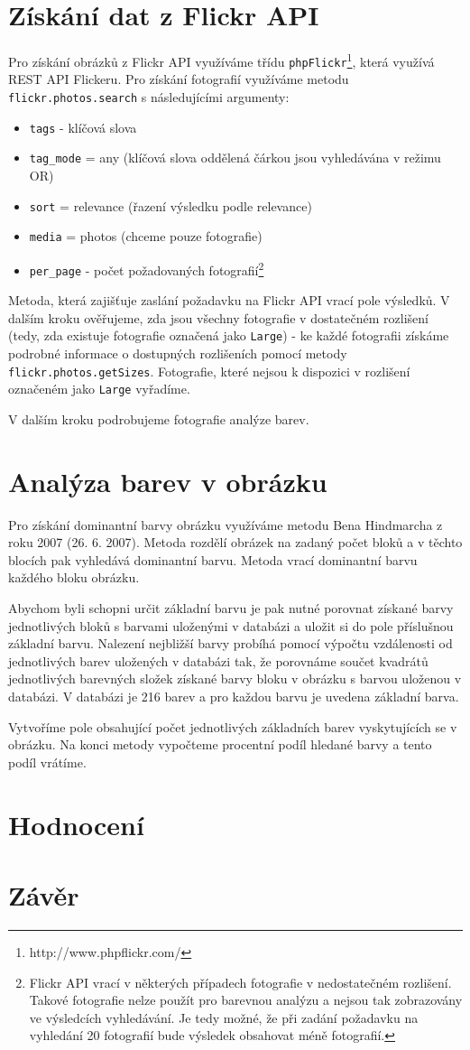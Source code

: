 \documentclass[12pt]{article}
\begin{document}
\section{Získání dat z Flickr API}
Pro získání obrázků z Flickr API využíváme třídu \texttt{phpFlickr}\footnote{http://www.phpflickr.com/}, která využívá REST API Flickeru. Pro získání fotografií využíváme metodu \texttt{flickr.photos.search} s následujícími argumenty:
\begin{itemize}
\item \texttt{tags} - klíčová slova
\item \texttt{tag\_mode} = any (klíčová slova oddělená čárkou jsou vyhledávána v režimu OR)
\item \texttt{sort} = relevance (řazení výsledku podle relevance)
\item \texttt{media} = photos (chceme pouze fotografie)
\item \texttt{per\_page} - počet požadovaných fotografií\footnote{Flickr API vrací v některých případech fotografie v nedostatečném rozlišení. Takové fotografie nelze použít pro barevnou analýzu a nejsou tak zobrazovány ve výsledcích vyhledávání. Je tedy možné, že při zadání požadavku na vyhledání 20 fotografií bude výsledek obsahovat méně fotografií.}
\end{itemize}

Metoda, která zajišťuje zaslání požadavku na Flickr API vrací pole výsledků. V dalším kroku ověřujeme, zda jsou všechny fotografie v dostatečném rozlišení (tedy, zda existuje fotografie označená jako \texttt{Large}) - ke každé fotografii získáme podrobné informace o dostupných rozlišeních pomocí metody \texttt{flickr.photos.getSizes}. Fotografie, které nejsou k dispozici v rozlišení označeném jako \texttt{Large} vyřadíme.

V dalším kroku podrobujeme fotografie analýze barev.

\section{Analýza barev v obrázku}
Pro získání dominantní barvy obrázku využíváme metodu Bena Hindmarcha z roku 2007 (26. 6. 2007). Metoda rozdělí obrázek na zadaný počet bloků a v těchto blocích pak vyhledává dominantní barvu. Metoda vrací dominantní barvu každého bloku obrázku.

Abychom byli schopni určit základní barvu je pak nutné porovnat získané barvy jednotlivých bloků s barvami uloženými v databázi a uložit si do pole příslušnou základní barvu. Nalezení nejbližší barvy probíhá pomocí výpočtu vzdálenosti od jednotlivých barev uložených v databázi tak, že porovnáme součet kvadrátů jednotlivých barevných složek získané barvy bloku v obrázku s barvou uloženou v databázi. V databázi je 216 barev a pro každou barvu je uvedena základní barva.

Vytvoříme pole obsahující počet jednotlivých základních barev vyskytujících se v obrázku. Na konci metody vypočteme procentní podíl hledané barvy a tento podíl vrátíme.

\section{Hodnocení}

\section{Závěr}
\end{document}
